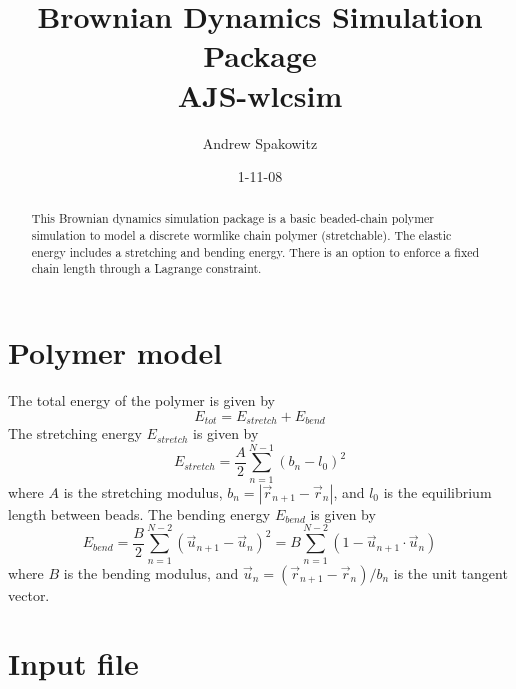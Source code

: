 \documentclass[11pt]{article}
\begin{document}
\title{Brownian Dynamics Simulation Package \\ AJS-wlcsim}
\author{Andrew Spakowitz}
\date{1-11-08}
\maketitle

\begin{abstract}
This Brownian dynamics simulation package is a basic beaded-chain
polymer simulation to model a discrete wormlike chain polymer (stretchable).
The elastic energy includes a stretching and bending energy.
There is an option to enforce a fixed chain length through a Lagrange constraint.
\end{abstract}

\section*{Polymer model}

The total energy of the polymer is given by
\begin{equation}
E_{tot} = E_{stretch} + E_{bend}
\end{equation}
\noindent
The stretching energy $E_{stretch}$ is given by
\begin{equation}
E_{stretch} = \frac{A}{2} \sum_{n=1}^{N-1} 
\left( 
b_{n} - l_{0}
\right)^{2}
\end{equation}
\noindent
where $A$ is the stretching modulus, $b_{n} = \left| \vec{r}_{n+1} - \vec{r}_{n} \right|$,
and $l_{0}$ is the equilibrium length between beads.
The bending energy $E_{bend}$ is given by
\begin{equation}
E_{bend} = 
\frac{B}{2} \sum_{n=1}^{N-2} \left(
\vec{u}_{n+1} - \vec{u}_{n}
\right)^{2}=
B \sum_{n=1}^{N-2} \left( 1 - \vec{u}_{n+1} \cdot \vec{u}_{n} \right)
\end{equation}
\noindent
where $B$ is the bending modulus, and
$\vec{u}_{n} = \left( \vec{r}_{n+1} - \vec{r}_{n} \right)/b_{n}$ is
the unit tangent vector.

\section*{Input file}
\end{document}

